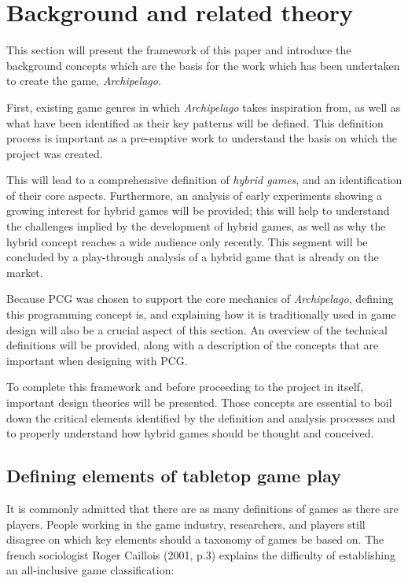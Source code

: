 \chapter{Background and related theory}
This section will present the framework of this paper and introduce the background concepts which are the basis for the work which has been undertaken to create the game, \textit{Archipelago}. 

First, existing game genres in which \textit{Archipelago} takes inspiration from, as well as what have been identified as their key patterns will be defined. This definition process is important as a pre-emptive work to understand the basis on which the project was created. 

This will lead to a comprehensive definition of \textit{hybrid games}, and an identification of their core aspects. Furthermore, an analysis of early experiments showing a growing interest for hybrid games will be provided; this will help to understand the challenges implied by the development of hybrid games, as well as why the hybrid concept reaches a wide audience only recently. This segment will be concluded by a play-through analysis of a hybrid game that is already on the market.

Because PCG was chosen to support the core mechanics of \textit{Archipelago}, defining this programming concept is, and explaining how it is traditionally used in game design will also be a crucial aspect of this section. An overview of the technical definitions will be provided, along with a description of the concepts that are important when designing with PCG. 

To complete this framework and before proceeding to the project in itself, important design theories will be presented. Those concepts are essential to boil down the critical elements identified by the definition and analysis processes and to properly understand how hybrid games should be thought and conceived.

\section{Defining elements of tabletop game play}
It is commonly admitted that there are as many definitions of games as there are players. People working in the game industry, researchers, and players still disagree on which key elements should a taxonomy of games be based on. The french sociologist Roger Caillois (2001, p.3) \cite{book:mpg} explains the difficulty of establishing an all-inclusive game classification:

